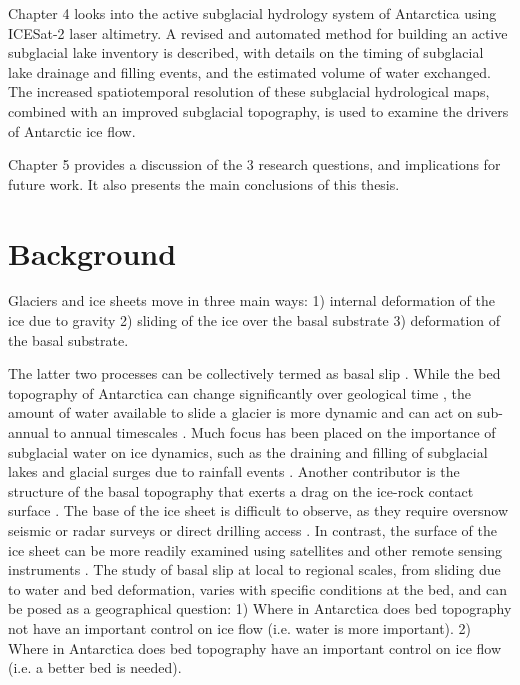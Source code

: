 Chapter 4 looks into the active subglacial hydrology system of Antarctica using ICESat-2 laser altimetry.
A revised and automated method for building an active subglacial lake inventory is described, with details on the timing of subglacial lake drainage and filling events, and the estimated volume of water exchanged.
The increased spatiotemporal resolution of these subglacial hydrological maps, combined with an improved subglacial topography, is used to examine the drivers of Antarctic ice flow.

Chapter 5 provides a discussion of the 3 research questions, and implications for future work.
It also presents the main conclusions of this thesis.


\section{Background}

Glaciers and ice sheets move in three main ways:
1) internal deformation of the ice due to gravity
2) sliding of the ice over the basal substrate
3) deformation of the basal substrate.

The latter two processes can be collectively termed as basal slip \citep{Cuffeyphysicsglaciers2010}.
While the bed topography of Antarctica can change significantly over geological time \citep[e.g.][]{HochmuthEvolvingPaleobathymetryCircum2020}, the amount of water available to slide a glacier is more dynamic and can act on sub-annual to annual timescales \citep[e.g.][]{SiegfriedEpisodicicevelocity2016}.
Much focus has been placed on the importance of subglacial water on ice dynamics, such as the draining and filling of subglacial lakes \citep[e.g.][]{Smithinventoryactivesubglacial2009,SiegfriedThirteenyearssubglacial2018} and glacial surges due to rainfall events \citep[e.g.][]{IkenUpliftUnteraargletscherBeginning1983}.
Another contributor is the structure of the basal topography that exerts a drag on the ice-rock contact surface \citep[e.g.][]{Kyrke-SmithRelevanceDetailBasal2018}.
The base of the ice sheet is difficult to observe, as they require oversnow seismic or radar surveys \citep[e.g.][]{HolschuhLinkingpostglaciallandscapes2020} or direct drilling access \citep[e.g.][]{TulaczykWISSARDSubglacialLake2014}.
In contrast, the surface of the ice sheet can be more readily examined using satellites and other remote sensing instruments \citep[e.g.][]{HowatReferenceElevationModel2019,MouginotContinentWideInterferometric2019}.
The study of basal slip at local to regional scales, from sliding due to water and bed deformation, varies with specific conditions at the bed, and can be posed as a geographical question:  %
1) Where in Antarctica does bed topography not have an important control on ice flow (i.e. water is more important).
2) Where in Antarctica does bed topography have an important control on ice flow (i.e. a better bed is needed).

